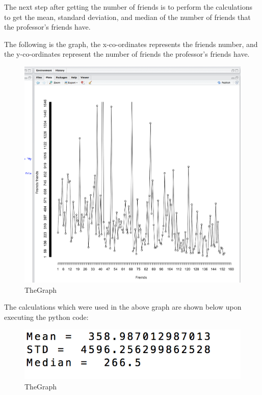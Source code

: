 \documentclass{article}
\begin{document}
The next step after getting the number of friends is to perform the calculations to get the mean, standard deviation, and median of the number of friends that the professor's friends have.


The following is the graph, the x-co-ordinates represents the friends number, and the y-co-ordinates represent the number of friends the professor's friends have.

\begin{figure}
\centering
\includegraphics[scale=0.25]{fig1.png}
\caption{TheGraph}
\label{fig:fig.png}
\end{figure}

The calculations which were used in the above graph are shown below upon executing the python code:

\begin{figure}
\centering
\includegraphics[scale=0.95]{ah.png}
\caption{TheGraph}
\label{fig:fig.png}
\end{figure}
\newpage
\end{document}
